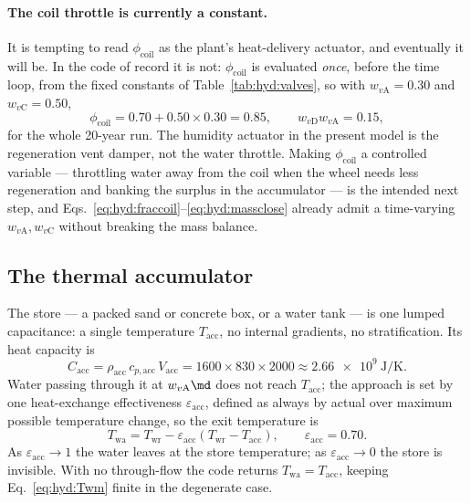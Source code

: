 \paragraph{The coil throttle is currently a constant.} It is tempting to read
$\phi_{\mathrm{coil}}$ as the plant's heat-delivery actuator, and eventually it will be. In the
code of record it is not: $\phi_{\mathrm{coil}}$ is evaluated \emph{once}, before the time
loop, from the fixed constants of Table~\ref{tab:hyd:valves}, so with
$w_{v\mathrm{A}}=\num{0.30}$ and $w_{v\mathrm{C}}=\num{0.50}$,
\begin{equation}
\phi_{\mathrm{coil}}=0.70+0.50\times0.30=\num{0.85},
\qquad
w_{v\mathrm{D}}w_{v\mathrm{A}}=\num{0.15},
\label{eq:hyd:fracnum}
\end{equation}
for the whole \num{20}-year run. The humidity actuator in the present model is the regeneration
vent damper, not the water throttle. Making $\phi_{\mathrm{coil}}$ a controlled variable ---
throttling water away from the coil when the wheel needs less regeneration and banking the
surplus in the accumulator --- is the intended next step, and
Eqs.~\eqref{eq:hyd:fraccoil}--\eqref{eq:hyd:massclose} already admit a time-varying
$w_{v\mathrm{A}},w_{v\mathrm{C}}$ without breaking the mass balance.

\subsection{The thermal accumulator}
\label{sec:hyd:acc}

The store --- a packed sand or concrete box, or a water tank --- is one lumped capacitance: a
single temperature $T_{\mathrm{acc}}$, no internal gradients, no stratification. Its heat
capacity is
\begin{equation}
C_{\mathrm{acc}}=\rho_{\mathrm{acc}}\,c_{p,\mathrm{acc}}\,V_{\mathrm{acc}}
=\num{1600}\times\num{830}\times\num{2000}
\approx\SI{2.66e9}{\joule\per\kelvin}.
\label{eq:hyd:Cacc}
\end{equation}
Water passing through it at $w_{v\mathrm{A}}\md$ does not reach $T_{\mathrm{acc}}$; the
approach is set by one heat-exchange effectiveness $\varepsilon_{\mathrm{acc}}$, defined as
always by actual over maximum possible temperature change, so the exit temperature is
\begin{equation}
T_{\mathrm{wa}}=T_{\mathrm{wr}}-\varepsilon_{\mathrm{acc}}
\left(T_{\mathrm{wr}}-T_{\mathrm{acc}}\right),
\qquad \varepsilon_{\mathrm{acc}}=\num{0.70}.
\label{eq:hyd:Twa}
\end{equation}
As $\varepsilon_{\mathrm{acc}}\to1$ the water leaves at the store temperature; as
$\varepsilon_{\mathrm{acc}}\to0$ the store is invisible. With no through-flow the code returns
$T_{\mathrm{wa}}=T_{\mathrm{acc}}$, keeping Eq.~\eqref{eq:hyd:Twm} finite in the degenerate
case.

